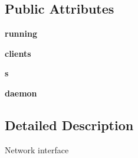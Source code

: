 \subsection*{Public Attributes}
\begin{DoxyCompactItemize}
\item 
\hypertarget{classserver_1_1Network_aeefb1ebd2458414c630a85a12b2d2eab}{
{\bfseries running}}
\label{classserver_1_1Network_aeefb1ebd2458414c630a85a12b2d2eab}

\item 
\hypertarget{classserver_1_1Network_aa56ec41dd847ce96a675d5f94f7c5264}{
{\bfseries clients}}
\label{classserver_1_1Network_aa56ec41dd847ce96a675d5f94f7c5264}

\item 
\hypertarget{classserver_1_1Network_a1264b49262cf955848a0f2d2f928e012}{
{\bfseries s}}
\label{classserver_1_1Network_a1264b49262cf955848a0f2d2f928e012}

\item 
\hypertarget{classserver_1_1Network_aa8fbad2d74eb9fd8952ba86759307caa}{
{\bfseries daemon}}
\label{classserver_1_1Network_aa8fbad2d74eb9fd8952ba86759307caa}

\end{DoxyCompactItemize}


\subsection{Detailed Description}
\begin{DoxyVerb}
Network interface
\end{DoxyVerb}
 

